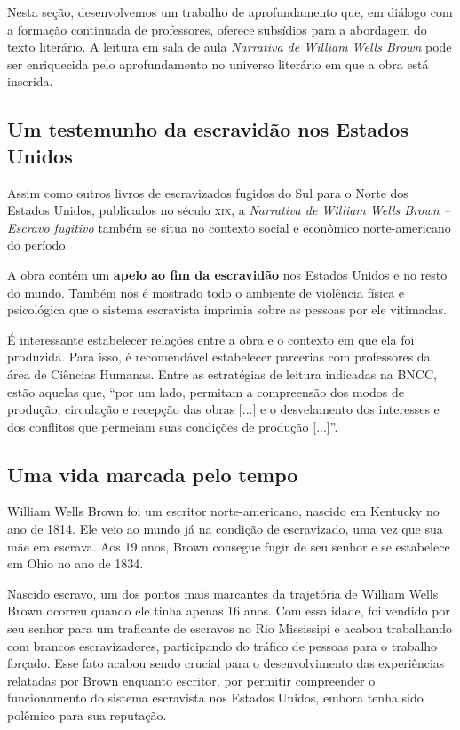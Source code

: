 \documentclass[11pt]{extarticle}
\begin{document}
\begin{enumerate}
Nesta seção, desenvolvemos um trabalho de aprofundamento que, em diálogo
com a formação continuada de professores, oferece subsídios para a
abordagem do texto literário. A leitura em sala de aula \emph{Narrativa
de William Wells Brown} pode ser enriquecida pelo aprofundamento no
universo literário em que a obra está inserida.

\subsection{Um testemunho da escravidão nos Estados Unidos}

Assim como outros livros de escravizados fugidos do Sul para o Norte dos
Estados Unidos, publicados no século \textsc{xix}, a \emph{Narrativa de William
Wells Brown -- Escravo fugitivo} também se situa no contexto social e
econômico norte-americano do período.

A obra contém um \textbf{apelo ao fim da escravidão} nos Estados Unidos
e no resto do mundo. Também nos é mostrado todo o ambiente de violência
física e psicológica que o sistema escravista imprimia sobre as pessoas
por ele vitimadas.

É interessante estabelecer relações entre a obra e o contexto em que ela
foi produzida. Para isso, é recomendável estabelecer parcerias com
professores da área de Ciências Humanas. Entre as estratégias de leitura
indicadas na BNCC, estão aquelas que, ``por um lado, permitam a
compreensão dos modos de produção, circulação e recepção das obras
{[}...{]} e o desvelamento dos interesses e dos conflitos que permeiam
suas condições de produção {[}...{]}''.

\subsection{Uma vida marcada pelo tempo}

William Wells Brown foi um escritor norte-americano, nascido em
Kentucky no ano de 1814. Ele veio ao mundo já na condição de
escravizado, uma vez que sua mãe era escrava. Aos 19 anos, Brown
consegue fugir de seu senhor e se estabelece em Ohio no ano de 1834.

Nascido escravo, um dos pontos mais marcantes da trajetória de William
Wells Brown ocorreu quando ele tinha apenas 16 anos. Com essa idade, foi
vendido por seu senhor para um traficante de escravos no Rio Mississipi
e acabou trabalhando com brancos escravizadores, participando do tráfico
de pessoas para o trabalho forçado. Esse fato acabou sendo crucial para
o desenvolvimento das experiências relatadas por Brown enquanto
escritor, por permitir compreender o funcionamento do sistema escravista
nos Estados Unidos, embora tenha sido polêmico para sua reputação.


\end{enumerate}
\end{document}
